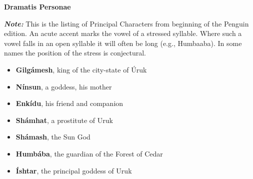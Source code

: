 \documentclass{article}
\begin{document}
\vspace{-1.25em}
\setlength{\columnwidth}{0.5\textwidth}
\begin{multicols}{3}



\noindent \textbf{Dramatis Personae}
\vspace{0.15em}

\begin{small}%

\noindent 
\textbf{\textit{Note:}} This is the listing of Principal Characters from beginning of the Penguin edition.
An acute accent marks the vowel of a stressed syllable.
Where such a vowel falls in an open syllable it will often be long (e.g., Humbaaba).
In some names the position of the stress is conjectural.
\vspace{0.3em}

\begin{itemize}[
        label=,
        leftmargin=1.0em,
        itemindent=-1.0em,
        nosep,
    ]

    \item \textbf{Gilgámesh}, king of the city-state of Úruk

    \item \textbf{Nínsun}, a goddess, his mother

    \item \textbf{Enkídu}, his friend and companion

    \item \textbf{Shámhat}, a prostitute of Uruk

    \item \textbf{Shámash}, the Sun God

    \item \textbf{Humbába}, the guardian of the Forest of Cedar

    \item \textbf{Íshtar}, the principal goddess of Uruk


\end{itemize}
\end{small}
\end{multicols}
\end{document}

